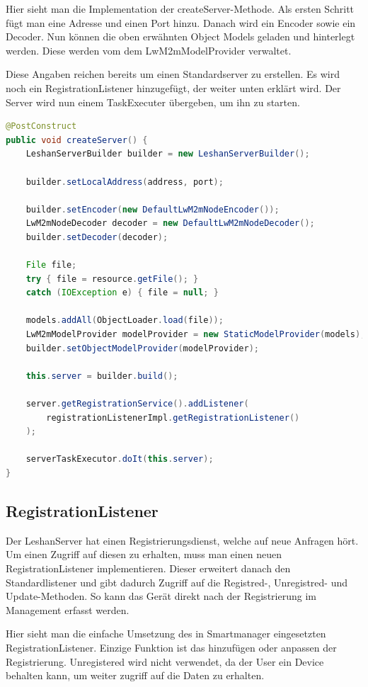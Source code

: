 Hier sieht man die Implementation der createServer-Methode. Als ersten Schritt fügt man eine Adresse und einen Port hinzu. Danach wird ein Encoder sowie ein Decoder. Nun können die oben erwähnten Object Models geladen und hinterlegt werden. Diese werden vom dem LwM2mModelProvider verwaltet.

Diese Angaben reichen bereits um einen Standardserver zu erstellen. Es wird noch ein RegistrationListener hinzugefügt, der weiter unten erklärt wird. Der Server wird nun einem TaskExecuter übergeben, um ihn zu starten.

\begin{lstlisting}[language=java]
@PostConstruct
public void createServer() {
	LeshanServerBuilder builder = new LeshanServerBuilder();

	builder.setLocalAddress(address, port);
		
	builder.setEncoder(new DefaultLwM2mNodeEncoder());
	LwM2mNodeDecoder decoder = new DefaultLwM2mNodeDecoder();
	builder.setDecoder(decoder);

	File file;
	try { file = resource.getFile(); } 
	catch (IOException e) { file = null; }

	models.addAll(ObjectLoader.load(file));
	LwM2mModelProvider modelProvider = new StaticModelProvider(models);
	builder.setObjectModelProvider(modelProvider);

	this.server = builder.build();
		
	server.getRegistrationService().addListener(
		registrationListenerImpl.getRegistrationListener()
	);
		
	serverTaskExecutor.doIt(this.server);
}
\end{lstlisting}
 
\subsection{RegistrationListener}
Der LeshanServer hat einen Registrierungsdienst, welche auf neue Anfragen hört. Um einen Zugriff auf diesen zu erhalten, muss man einen neuen RegistrationListener implementieren. Dieser erweitert danach den Standardlistener und gibt dadurch Zugriff auf die Registred-, Unregistred- und Update-Methoden. So kann das Gerät direkt nach der Registrierung im Management erfasst werden. 

Hier sieht man die einfache Umsetzung des in Smartmanager eingesetzten RegistrationListener. Einzige Funktion ist das hinzufügen oder anpassen der Registrierung. Unregistered wird nicht verwendet, da der User ein Device behalten kann, um weiter zugriff auf die Daten zu erhalten. 

